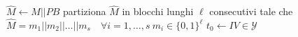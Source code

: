 \begin{algorithm}[H]
    \SetAlgoVlined
    \SetAlgoLined
    \label{alg:markle}
    


    \caption{Merkle Damgard($h,x,Q$)}
    $\hat{M} \gets M || PB$\;
    partiziona $\hat{M}$ in blocchi lunghi $\ell$ consecutivi tale che\;
    $\hat{M} = m_1 || m_2 || \dots || m_s \quad \forall i = 1,\dots, s \ m_i \in \{0,1\}^{\ell}$\;
    $t_0 \gets IV \in \mathcal{Y}$\;

    \;
\end{algorithm}
